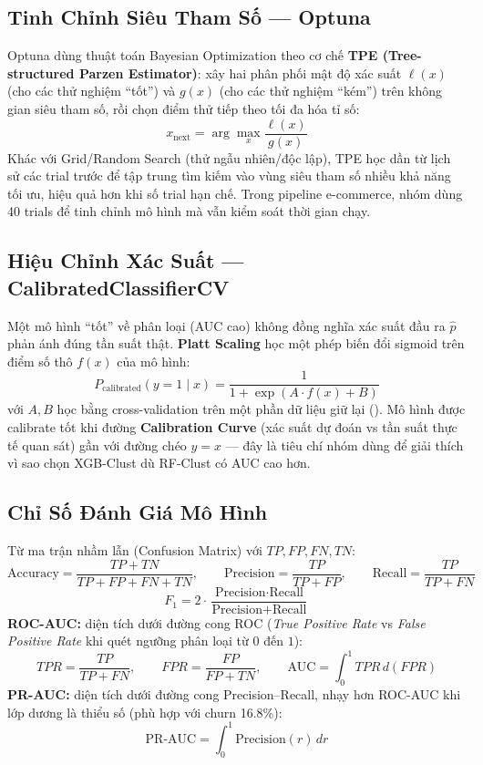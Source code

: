\documentclass[12pt,a4paper]{article}
\newcommand{\code}[1]{\begingroup\small\ttfamily\seqsplit{#1}\endgroup}
\begin{document}
\subsection{Tinh Chỉnh Siêu Tham Số --- Optuna}

Optuna dùng thuật toán Bayesian Optimization theo cơ chế \textbf{TPE (Tree-structured Parzen
Estimator)}: xây hai phân phối mật độ xác suất $\ell(x)$ (cho các thử nghiệm ``tốt'') và $g(x)$ (cho
các thử nghiệm ``kém'') trên không gian siêu tham số, rồi chọn điểm thử tiếp theo tối đa hóa tỉ số:
\[
  x_{\text{next}} = \arg\max_x \dfrac{\ell(x)}{g(x)}
\]
Khác với Grid/Random Search (thử ngẫu nhiên/độc lập), TPE học dần từ lịch sử các trial trước để tập
trung tìm kiếm vào vùng siêu tham số nhiều khả năng tối ưu, hiệu quả hơn khi số trial hạn chế. Trong
pipeline e-commerce, nhóm dùng 40 trials để tinh chỉnh mô hình mà vẫn kiểm soát thời gian chạy.

\subsection{Hiệu Chỉnh Xác Suất --- CalibratedClassifierCV}

Một mô hình ``tốt'' về phân loại (AUC cao) không đồng nghĩa xác suất đầu ra $\hat{p}$ phản ánh đúng
tần suất thật. \textbf{Platt Scaling} học một phép biến đổi sigmoid trên điểm số thô $f(x)$ của mô
hình:
\[
  P_{\text{calibrated}}(y=1\mid x) = \dfrac{1}{1+\exp(A\cdot f(x) + B)}
\]
với $A,B$ học bằng cross-validation trên một phần dữ liệu giữ lại (\code{cv=5}). Mô hình được
calibrate tốt khi đường \textbf{Calibration Curve} (xác suất dự đoán vs tần suất thực tế quan
sát) gần với đường chéo $y=x$ --- đây là tiêu chí nhóm dùng để giải thích vì sao chọn XGB-Clust dù
RF-Clust có AUC cao hơn.

\subsection{Chỉ Số Đánh Giá Mô Hình}

Từ ma trận nhầm lẫn (Confusion Matrix) với $TP, FP, FN, TN$:
\[
  \text{Accuracy} = \dfrac{TP+TN}{TP+FP+FN+TN}, \qquad
  \text{Precision} = \dfrac{TP}{TP+FP}, \qquad
  \text{Recall} = \dfrac{TP}{TP+FN}
\]
\[
  F_1 = 2\cdot\dfrac{\text{Precision}\cdot\text{Recall}}{\text{Precision}+\text{Recall}}
\]
\textbf{ROC-AUC:} diện tích dưới đường cong ROC (\textit{True Positive Rate} vs \textit{False
Positive Rate} khi quét ngưỡng phân loại từ $0$ đến $1$):
\[
  TPR = \dfrac{TP}{TP+FN}, \qquad FPR = \dfrac{FP}{FP+TN}, \qquad \text{AUC} = \int_0^1 TPR\, d(FPR)
\]
\textbf{PR-AUC:} diện tích dưới đường cong Precision--Recall, nhạy hơn ROC-AUC khi lớp dương là
thiểu số (phù hợp với churn 16.8\%):
\[
  \text{PR-AUC} = \int_0^1 \text{Precision}(r)\, dr
\]
\end{document}
